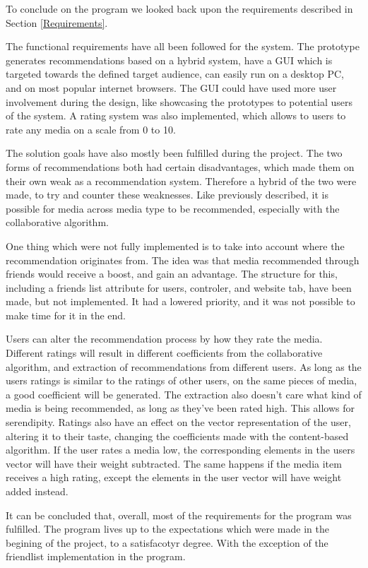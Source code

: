 To conclude on the program we looked back upon the requirements described in Section \ref{Requirements}.

The functional requirements have all been followed for the system. The prototype generates recommendations based on a hybrid system, have a GUI which is targeted towards the defined target audience, can easily run on a desktop PC, and on most popular internet browsers. The GUI could have used more user involvement during the design, like showcasing the prototypes to potential users of the system. A rating system was also implemented, which allows to users to rate any media on a scale from 0 to 10.

The solution goals have also mostly been fulfilled during the project. The two forms of recommendations both had certain disadvantages, which made them on their own weak as a recommendation system. Therefore a hybrid of the two were made, to try and counter these weaknesses. Like previously described, it is possible for media across media type to be recommended, especially with the collaborative algorithm. 

One thing which were not fully implemented is to take into account where the recommendation originates from. The idea was that media recommended through friends would receive a boost, and gain an advantage. The structure for this, including a friends list attribute for users, controler, and website tab, have been made, but not implemented. It had a lowered priority, and it was not possible to make time for it in the end. 

Users can alter the recommendation process by how they rate the media. Different ratings will result in different coefficients from the collaborative algorithm, and extraction of recommendations from different users. As long as the users ratings is similar to the ratings of other users, on the same pieces of media, a good coefficient will be generated. The extraction also doesn’t care what kind of media is being recommended, as long as they’ve been rated high. This allows for serendipity. Ratings also have an effect on the vector representation of the user, altering it to their taste, changing the coefficients made with the content-based algorithm. If the user rates a media low, the corresponding elements in the users vector will have their weight subtracted. The same happens if the media item receives a high rating, except the elements in the user vector will have weight added instead.

It can be concluded that, overall, most of the requirements for the program was fulfilled. The program lives up to the expectations which were made in the begining of the project, to a satisfacotyr degree. With the exception of the friendlist implementation in the program.